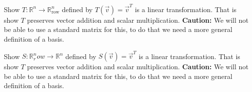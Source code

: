 \begin{exercise}
Show $T:\mathbb{R}^n \to \mathbb{R}^n_\text{row}$ defined by $T(\vec{v})=\vec{v}^T$ is a linear transformation. That is show $T$ preserves vector addition and scalar multiplication. \textbf{Caution:} We will not be able to use a standard matrix for this, to do that we need a more general definition of a basis.
\end{exercise}

\begin{exercise}
Show $S:\mathbb{R}^n_row \to \mathbb{R}^n$ defined by $S(\vec{v})=\vec{v}^T$ is a linear transformation. That is show $T$ preserves vector addition and scalar multiplication. \textbf{Caution:} We will not be able to use a standard matrix for this, to do that we need a more general definition of a basis.
\end{exercise}